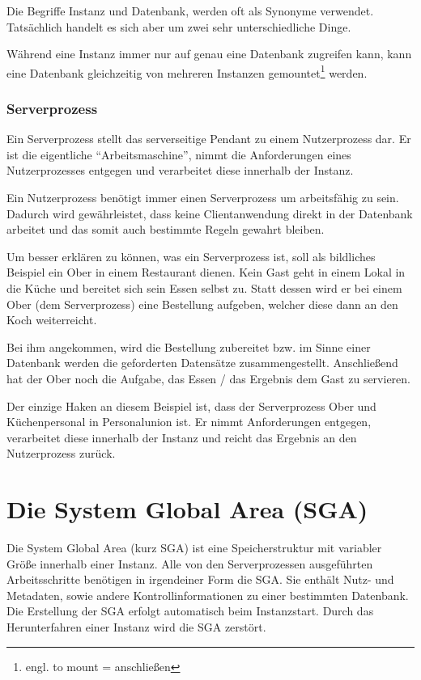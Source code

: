           \begin{merke}
            Die Begriffe Instanz und Datenbank, werden oft als Synonyme verwendet. Tatsächlich handelt es sich aber um zwei sehr unterschiedliche Dinge.
          \end{merke}
          Während eine Instanz immer nur auf genau eine Datenbank zugreifen kann, kann eine Datenbank gleichzeitig von mehreren Instanzen gemountet\footnote{engl. to mount = anschließen} werden.

\clearpage
        \subsubsection{Serverprozess}
          Ein Serverprozess stellt das serverseitige Pendant zu einem Nutzerprozess dar. Er ist die eigentliche \enquote{Arbeitsmaschine}, nimmt die Anforderungen eines Nutzerprozesses entgegen und verarbeitet diese innerhalb der Instanz.

          \begin{merke}
            Ein Nutzerprozess benötigt immer einen Serverprozess um arbeitsfähig zu sein. Dadurch wird gewährleistet, dass keine Clientanwendung direkt in der Datenbank arbeitet und das somit auch bestimmte Regeln gewahrt bleiben.
          \end{merke}

          Um besser erklären zu können, was ein Serverprozess ist, soll als bildliches Beispiel ein Ober in einem Restaurant dienen. Kein Gast geht in einem Lokal in die Küche und bereitet sich sein Essen selbst zu. Statt dessen wird er bei einem Ober (dem Serverprozess) eine Bestellung aufgeben, welcher diese dann an den Koch weiterreicht.

          Bei ihm  angekommen, wird die Bestellung zubereitet bzw. im Sinne einer Datenbank werden die geforderten Datensätze zusammengestellt. Anschließend hat der Ober noch die Aufgabe, das Essen / das Ergebnis dem Gast zu servieren.

          Der einzige Haken an diesem Beispiel ist, dass der Serverprozess Ober und Küchenpersonal in Personalunion ist. Er nimmt Anforderungen entgegen, verarbeitet diese innerhalb der Instanz und reicht das Ergebnis an den Nutzerprozess zurück.


     \section{Die System Global Area (SGA)}
        Die System Global Area (kurz SGA) ist eine Speicherstruktur mit variabler Größe innerhalb einer Instanz. Alle von den Serverprozessen ausgeführten Arbeitsschritte benötigen in irgendeiner Form die SGA. Sie enthält Nutz- und Metadaten, sowie andere Kontrollinformationen zu einer bestimmten Datenbank. Die Erstellung der SGA erfolgt automatisch beim Instanzstart. Durch das Herunterfahren einer Instanz wird die SGA zerstört.

